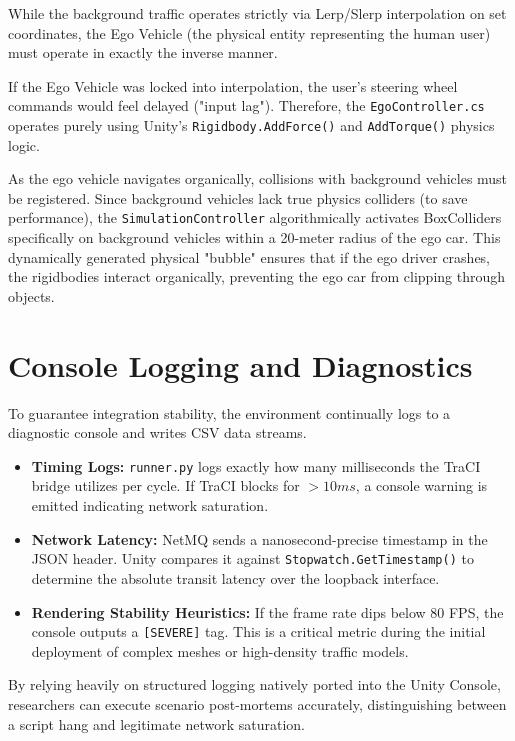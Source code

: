 While the background traffic operates strictly via Lerp/Slerp interpolation on set coordinates, the Ego Vehicle (the physical entity representing the human user) must operate in exactly the inverse manner. 

If the Ego Vehicle was locked into interpolation, the user’s steering wheel commands would feel delayed ("input lag"). Therefore, the \texttt{EgoController.cs} operates purely using Unity's \texttt{Rigidbody.AddForce()} and \texttt{AddTorque()} physics logic. 

As the ego vehicle navigates organically, collisions with background vehicles must be registered. Since background vehicles lack true physics colliders (to save performance), the \texttt{SimulationController} algorithmically activates BoxColliders specifically on background vehicles within a 20-meter radius of the ego car. This dynamically generated physical "bubble" ensures that if the ego driver crashes, the rigidbodies interact organically, preventing the ego car from clipping through objects.

\section{Console Logging and Diagnostics}

To guarantee integration stability, the environment continually logs to a diagnostic console and writes CSV data streams. 

\begin{itemize}[label={\color{AccentTeal}$\blacktriangleright$}, leftmargin=2em, itemsep=4pt]
    \item \textbf{Timing Logs:} \texttt{runner.py} logs exactly how many milliseconds the TraCI bridge utilizes per cycle. If TraCI blocks for $>10ms$, a console warning is emitted indicating network saturation.
    \item \textbf{Network Latency:} NetMQ sends a nanosecond-precise timestamp in the JSON header. Unity compares it against \texttt{Stopwatch.GetTimestamp()} to determine the absolute transit latency over the loopback interface.
    \item \textbf{Rendering Stability Heuristics:} If the frame rate dips below 80 FPS, the console outputs a \texttt{[SEVERE]} tag. This is a critical metric during the initial deployment of complex meshes or high-density traffic models.
\end{itemize}

By relying heavily on structured logging natively ported into the Unity Console, researchers can execute scenario post-mortems accurately, distinguishing between a script hang and legitimate network saturation.

